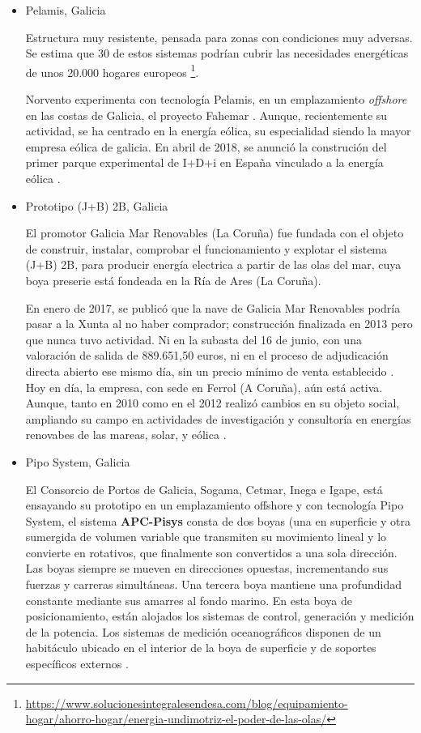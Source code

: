 \begin{itemize}
\item
  Pelamis, Galicia

  Estructura muy resistente, pensada para zonas con condiciones muy
  adversas. Se estima que 30 de estos sistemas podrían cubrir las
  necesidades energéticas de unos 20.000 hogares europeos \footnote{\url{https://www.solucionesintegralesendesa.com/blog/equipamiento-hogar/ahorro-hogar/energia-undimotriz-el-poder-de-las-olas/}}.

  Norvento experimenta con tecnología Pelamis, en un emplazamiento
  \emph{offshore} en las costas de Galicia, el proyecto Fahemar \cite{norvento14}. Aunque, recientemente su actividad, se ha centrado en la
  energía eólica, su especialidad siendo la mayor empresa eólica de
  galicia. En abril de 2018, se anunció la construción del primer parque
  experimental de I+D+i en España vinculado a la energía eólica \cite{norvento17}.


\item
  Prototipo (J+B) 2B, Galicia

  El promotor Galicia Mar Renovables (La Coruña) fue fundada con el
  objeto de construir, instalar, comprobar el funcionamiento y explotar
  el sistema (J+B) 2B, para producir energía electrica a partir de las
  olas del mar, cuya boya preserie está fondeada en la Ría de Ares (La
  Coruña).

  En enero de 2017, se publicó que la nave de Galicia Mar Renovables
  podría pasar a la Xunta al no haber comprador; construcción finalizada
  en 2013 pero que nunca tuvo actividad. Ni en la subasta del 16 de
  junio, con una valoración de salida de 889.651,50 euros, ni en el
  proceso de adjudicación directa abierto ese mismo día, sin un precio
  mínimo de venta establecido \cite{marrenovables17}. Hoy en día, la empresa, con sede en
  Ferrol (A Coruña), aún está activa. Aunque, tanto en 2010 como en el
  2012 realizó cambios en su objeto social, ampliando su campo en
  actividades de investigación y consultoría en energías renovabes de
  las mareas, solar, y eólica \cite{marrenovables12}.
\item
  Pipo System, Galicia

  El Consorcio de Portos de Galicia, Sogama, Cetmar, Inega e Igape, está
  ensayando su prototipo en un emplazamiento offshore y con tecnología
  Pipo System, el sistema \textbf{APC-Pisys} consta de dos boyas (una en
  superficie y otra sumergida de volumen variable que transmiten su
  movimiento lineal y lo convierte en rotativos, que finalmente son
  convertidos a una sola dirección. Las boyas siempre se mueven en
  direcciones opuestas, incrementando sus fuerzas y carreras
  simultáneas. Una tercera boya mantiene una profundidad constante
  mediante sus amarres al fondo marino. En esta boya de posicionamiento,
  están alojados los sistemas de control, generación y medición de la
  potencia. Los sistemas de medición oceanográficos disponen de un
  habitáculo ubicado en el interior de la boya de superficie y de
  soportes específicos externos \cite{norvento14}.


\end{itemize}
